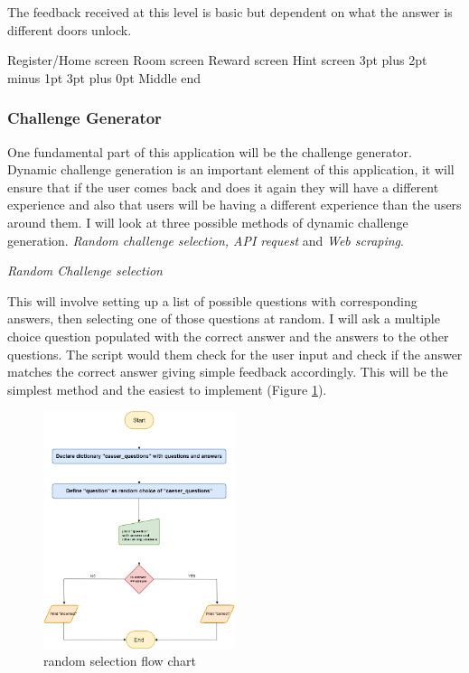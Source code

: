 \documentclass[12pt,a4paper]{article}
\makeatletter
\renewcommand\subsection{\@startsection {subsection}{1}{2mm} %
                               {3pt plus 2pt minus 1pt} %
                               {3pt plus 0pt} %
                               {\normalfont\bfseries}}
\makeatother
\begin{document}
The feedback received at this level is basic but dependent on what the answer is different doors unlock.

{Register/Home screen} 
{Room screen} 
{Reward screen} 
{Hint screen}
\subsection{Middle end}  
\subsubsection{Challenge Generator}  
One fundamental part of this application will be the challenge generator. Dynamic challenge generation is an important element of this application, it will ensure that if the user comes back and does it again they will have a different experience and also that users will be having a different experience than the users around them. I will look at three possible methods of dynamic challenge generation. \emph{Random challenge selection, API request} and \emph{Web scraping}.  

\emph{Random Challenge selection} 

This will involve setting up a list of possible questions with corresponding answers, then selecting one of those questions at random. I will ask a multiple choice question populated with the correct answer and the answers to the other questions. The script would them check for the user input and check if the answer matches the correct answer giving simple feedback accordingly. This will be the simplest method and the easiest to implement (Figure \ref{RandomSelection}).  

\begin{figure}[h]
    \centering
    \includegraphics[width=0.5\textwidth]{Figs/random_selection (1).png}
    \caption{random selection flow chart} 
    \label{RandomSelection}
\end{figure}   
\end{document}
